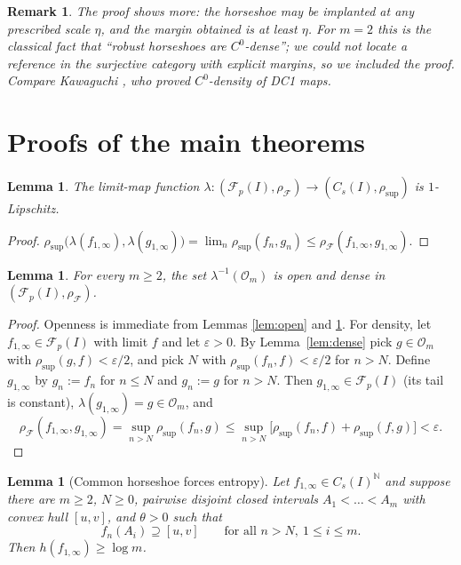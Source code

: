 \documentclass[11pt]{article}
\newtheorem{lemma}[theorem]{Lemma}
\newtheorem{remark}[theorem]{Remark}
\newcommand{\I}{I}
\newcommand{\Cs}{C_s(\I)}
\newcommand{\Fp}{\mathcal F_p(\I)}
\newcommand{\rsup}{\rho_{\sup}}
\newcommand{\rF}{\rho_{\mathcal F}}
\newcommand{\lm}{\lambda}
\begin{document}
\begin{remark}
The proof shows more: the horseshoe may be implanted at any prescribed scale
$\eta$, and the margin obtained is at least $\eta$.  For $m=2$ this is the
classical fact that ``robust horseshoes are $C^0$-dense''; we could not locate a
reference in the surjective category with explicit margins, so we included the
proof.  Compare Kawaguchi \cite{Kawaguchi}, who proved $C^0$-density of DC1 maps.
\end{remark}

\section{Proofs of the main theorems}\label{sec:proofs}

\begin{lemma}\label{lem:lambda}
The limit-map function $\lm:(\Fp,\rF)\to(\Cs,\rsup)$ is $1$-Lipschitz.
\end{lemma}

\begin{proof}
$\rsup\bigl(\lm(f_{1,\infty}),\lm(g_{1,\infty})\bigr)
=\lim_n\rsup(f_n,g_n)\le\rF(f_{1,\infty},g_{1,\infty})$.
\end{proof}

\begin{lemma}\label{lem:preimage-dense}
For every $m\ge2$, the set $\lm^{-1}(\mathcal O_m)$ is open and dense in
$(\Fp,\rF)$.
\end{lemma}

\begin{proof}
Openness is immediate from Lemmas \ref{lem:open} and \ref{lem:lambda}.  For
density, let $f_{1,\infty}\in\Fp$ with limit $f$ and let $\varepsilon>0$.  By
Lemma~\ref{lem:dense} pick $g\in\mathcal O_m$ with $\rsup(g,f)<\varepsilon/2$, and
pick $N$ with $\rsup(f_n,f)<\varepsilon/2$ for $n>N$.  Define
$g_{1,\infty}$ by $g_n:=f_n$ for $n\le N$ and $g_n:=g$ for $n>N$.  Then
$g_{1,\infty}\in\Fp$ (its tail is constant), $\lm(g_{1,\infty})=g\in\mathcal O_m$,
and
\[
\rF(f_{1,\infty},g_{1,\infty})
=\sup_{n>N}\rsup(f_n,g)
\le\sup_{n>N}\bigl[\rsup(f_n,f)+\rsup(f,g)\bigr]<\varepsilon .
\]
\end{proof}

\begin{lemma}[Common horseshoe forces entropy]\label{lem:common}
Let $f_{1,\infty}\in\Cs^{\mathbb N}$ and suppose there are $m\ge2$, $N\ge0$,
pairwise disjoint closed intervals $A_1<\dots<A_m$ with convex hull $[u,v]$, and
$\theta>0$ such that
\[
f_n(A_i)\supseteq[u,v]
\qquad\text{for all }n>N,\ 1\le i\le m .
\]
Then $h(f_{1,\infty})\ge\log m$.
\end{lemma}
\end{document}
